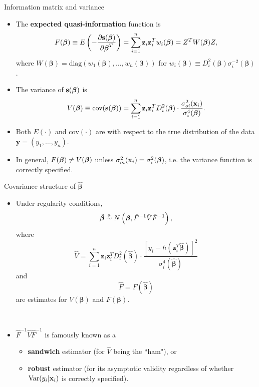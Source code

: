 \documentclass{beamer}
\newcommand{\boldbeta}{{\boldsymbol \beta}}
\newenvironment{wideitemize}%
  {\begin{itemize}%
    \setlength{\parskip}{1em}}%
  {\end{itemize}}
\begin{document}
\begin{frame}{Information matrix and variance}
\begin{wideitemize}

\item
The \textbf{expected quasi-information} function is
\[
F(\boldbeta)\equiv E\left(-\frac{\partial \textbf{s}(\mbox{\boldmath $\beta$})}{\partial
\mbox{\boldmath $\beta$}^T}\right)=\sum_{i=1}^n\textbf{z}_i\textbf{z}_i^Tw_i(\mbox{\boldmath $\beta$})
=Z^TW(\mbox{\boldmath $\beta$})Z,
\]
where $W({\boldsymbol \beta}) = \text{diag}(w_1({\boldsymbol \beta}), \dots, w_n({\boldsymbol \beta}))$ for 
$
w_i ({\boldsymbol \beta}) \equiv D_i^2({\boldsymbol \beta}) \sigma_i^{-2}({\boldsymbol \beta})$.
 

\item
The variance of $\textbf{s}(\mbox{\boldmath $\beta$})$ is
$$V(\mbox{\boldmath $\beta$})\equiv\mbox{cov}(\textbf{s}(\mbox{\boldmath $\beta$}))=
\sum_{i=1}^n\textbf{z}_i\textbf{z}_i^TD_i^2(\mbox{\boldmath $\beta$})\cdot\frac{\sigma_{oi}^2(\textbf{x}_i)}{
\sigma_i^4(\mbox{\boldmath $\beta$})}.$$
\item
Both $E(\cdot)$ and $\text{cov} (\cdot)$ are with respect to the true distribution of the data $\textbf{y} = (y_1, \dots, y_n)$. 

\item In general, $F(\mbox{\boldmath $\beta$})\neq V(\mbox{\boldmath $\beta$})$ unless 
$\sigma_{oi}^2(\textbf{x}_i)=\sigma_i^2(\mbox{\boldmath $\beta$})$, i.e. the variance function 
is correctly specified.
\end{wideitemize}
\end{frame}

\begin{frame}{Covariance structure of $\hat{\boldsymbol \beta}$ }
\begin{itemize}
\item
Under regularity conditions, 
\[
\hat{\boldbeta} \stackrel{a}{\sim} N\left(\mbox{\boldmath $\beta$}, \hat{F}^{-1}\hat{V}
\hat{F}^{-1}\right),
\]
where 
\[\hat{V}=\sum_{i=1}^n\textbf{z}_i\textbf{z}_i^T 
D_i^2(\hat{\boldbeta})\cdot\frac{[y_i-h(\textbf{z}_i^T\hat{\boldbeta})]^2}{
\sigma_i^4(\hat{\boldbeta})}\]
and
\[
\hat{F} = F(\hat{\boldbeta})
\]
are estimates for  $V(\boldbeta)$ and $F(\boldbeta)$.

\ \

\item $\hat{F}^{-1}\hat{V}
\hat{F}^{-1}$ is famously known as a
\begin{itemize}
\item {\bf sandwich} estimator (for $\hat{V}$ being the ``ham"),  or 
\item {\bf robust} estimator (for its asymptotic validity regardless of whether $\text{Var}(y_i| {\bf x}_i)$ is correctly specified).
\end{itemize}




\end{itemize}
\end{frame}
\end{document}
